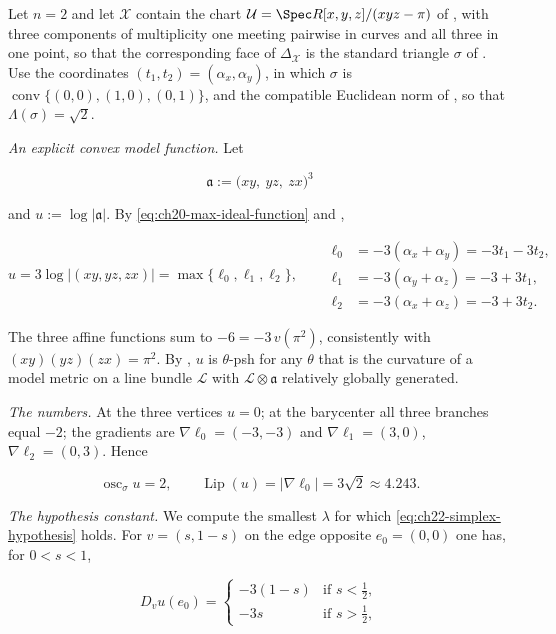 \begin{example}
\label{ex:ch22-modulus-triangle}
Let $n=2$ and let $\mathcal X$ contain the chart
$\mathcal U=\Spec R[x,y,z]/(xyz-\pi)$ of
, with three components of multiplicity one
meeting pairwise in curves and all three in one point, so that the
corresponding face of $\Delta_{\mathcal X}$ is the standard triangle
$\sigma$ of .  Use the coordinates
$(t_1,t_2)=(\alpha_x,\alpha_y)$, in which $\sigma$ is
$\operatorname{conv}\{(0,0),(1,0),(0,1)\}$, and the compatible Euclidean
norm of , so that
$\Lambda(\sigma)=\sqrt2$.

\emph{An explicit convex model function.}  Let

\[
\mathfrak a:=\bigl(xy,\ yz,\ zx\bigr)^3
\]

and $u:=\log|\mathfrak a|$.  By \eqref{eq:ch20-max-ideal-function} and
,

\[
 u=3\log|(xy,yz,zx)|=\max\{\ell_0,\ell_1,\ell_2\},
 \qquad
 \begin{aligned}
 \ell_0&=-3(\alpha_x+\alpha_y)=-3t_1-3t_2,\\
 \ell_1&=-3(\alpha_y+\alpha_z)=-3+3t_1,\\
 \ell_2&=-3(\alpha_x+\alpha_z)=-3+3t_2 .
 \end{aligned}
\tag{22.60}\label{eq:ch22-triangle-function}
\]

The three affine functions sum to $-6=-3\,v(\pi^2)$, consistently with
$(xy)(yz)(zx)=\pi^2$.  By
, $u$ is $\theta$-psh for any
$\theta$ that is the curvature of a model metric on a line bundle
$\mathcal L$ with $\mathcal L\otimes\mathfrak a$ relatively globally
generated.

\emph{The numbers.}  At the three vertices $u=0$; at the barycenter all
three branches equal $-2$; the gradients are
$\nabla\ell_0=(-3,-3)$ and $\nabla\ell_1=(3,0)$,
$\nabla\ell_2=(0,3)$.  Hence

\[
 \operatorname{osc}_\sigma u=2,
 \qquad
 \operatorname{Lip}(u)=|\nabla\ell_0|=3\sqrt2\approx4.243 .
\tag{22.61}\label{eq:ch22-triangle-numbers}
\]

\emph{The hypothesis constant.}  We compute the smallest $\lambda$ for
which \eqref{eq:ch22-simplex-hypothesis} holds.  For $v=(s,1-s)$ on the
edge opposite $e_0=(0,0)$ one has, for $0<s<1$,

\[
 D_vu(e_0)=
 \begin{cases}
  -3(1-s)&\text{if }s<\tfrac12,\\
  -3s&\text{if }s>\tfrac12,
 \end{cases}
\]


\end{example}
